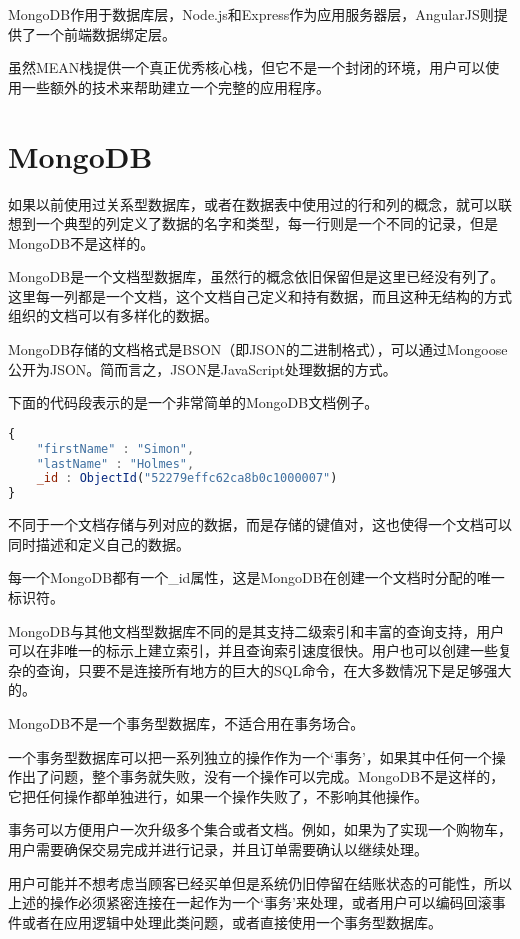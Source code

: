 MongoDB作用于数据库层，Node.js和Express作为应用服务器层，AngularJS则提供了一个前端数据绑定层。

虽然MEAN栈提供一个真正优秀核心栈，但它不是一个封闭的环境，用户可以使用一些额外的技术来帮助建立一个完整的应用程序。


\section{MongoDB}

如果以前使用过关系型数据库，或者在数据表中使用过的行和列的概念，就可以联想到一个典型的列定义了数据的名字和类型，每一行则是一个不同的记录，但是MongoDB不是这样的。

MongoDB是一个文档型数据库，虽然行的概念依旧保留但是这里已经没有列了。这里每一列都是一个文档，这个文档自己定义和持有数据，而且这种无结构的方式组织的文档可以有多样化的数据。

MongoDB存储的文档格式是BSON（即JSON的二进制格式），可以通过Mongoose公开为JSON。简而言之，JSON是JavaScript处理数据的方式。

下面的代码段表示的是一个非常简单的MongoDB文档例子。

\begin{lstlisting}[language=JavaScript]
{
    "firstName" : "Simon",    
    "lastName" : "Holmes", 
    _id : ObjectId("52279effc62ca8b0c1000007")    
}
\end{lstlisting}

不同于一个文档存储与列对应的数据，而是存储的键值对，这也使得一个文档可以同时描述和定义自己的数据。

每一个MongoDB都有一个\_id属性，这是MongoDB在创建一个文档时分配的唯一标识符。

MongoDB与其他文档型数据库不同的是其支持二级索引和丰富的查询支持，用户可以在非唯一的标示上建立索引，并且查询索引速度很快。用户也可以创建一些复杂的查询，只要不是连接所有地方的巨大的SQL命令，在大多数情况下是足够强大的。

MongoDB不是一个事务型数据库，不适合用在事务场合。

一个事务型数据库可以把一系列独立的操作作为一个‘事务’，如果其中任何一个操作出了问题，整个事务就失败，没有一个操作可以完成。MongoDB不是这样的，它把任何操作都单独进行，如果一个操作失败了，不影响其他操作。

事务可以方便用户一次升级多个集合或者文档。例如，如果为了实现一个购物车，用户需要确保交易完成并进行记录，并且订单需要确认以继续处理。

用户可能并不想考虑当顾客已经买单但是系统仍旧停留在结账状态的可能性，所以上述的操作必须紧密连接在一起作为一个‘事务’来处理，或者用户可以编码回滚事件或者在应用逻辑中处理此类问题，或者直接使用一个事务型数据库。

